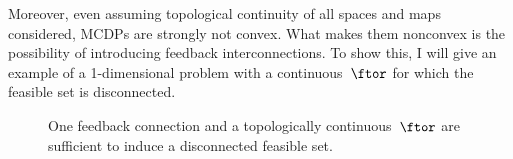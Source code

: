 Moreover, even assuming topological continuity of all spaces and maps
considered, MCDPs are strongly not convex. What makes them nonconvex
is the possibility of introducing feedback interconnections. To show
this, I will give an example of a 1-dimensional problem with a continuous~$\ftor$
for which the feasible set is disconnected.

\begin{figure}[H]
\hfill{}\hfill{}\hfill{}

\caption{\label{fig:ceil-1}One feedback connection and a topologically continuous~$\ftor$
are sufficient to induce a disconnected feasible set.}
\end{figure}

